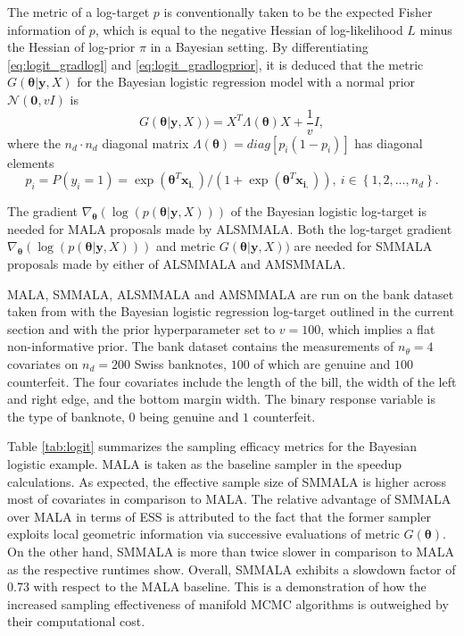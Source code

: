 \documentclass[twoside,11pt]{article}
\begin{document}
The metric of a log-target $p$ is conventionally taken to be the expected Fisher information of $p$, which is equal to the 
negative Hessian of log-likelihood $L$ minus the Hessian of log-prior $\pi$ in a Bayesian setting. By differentiating 
\eqref{eq:logit_gradlogl} and \eqref{eq:logit_gradlogprior}, it is deduced that the metric 
$G(\boldsymbol{\theta}|\mathbf{y}, X)$ for the Bayesian logistic regression model with a normal prior
$\mathcal{N}(\boldsymbol{0},vI)$ is
\begin{equation}
\label{eq:blr:G:normalprior}
G(\boldsymbol{\theta}|\mathbf{y}, X))=X^T\Lambda(\boldsymbol{\theta})X+
\frac{1}{v}I,
\end{equation}
where the $n_d\cdot n_d$ diagonal matrix $\Lambda(\boldsymbol{\theta})=diag[p_i(1-p_i)]$ has diagonal elements
\begin{equation}
p_i=P(y_i=1)=\exp(\boldsymbol{\theta}^T\mathbf{x_{i,}})/
(1+\exp(\boldsymbol{\theta}^T\mathbf{x_{i,}})),~i\in\left\{1,2,\dots,n_{d}\right\}.
\end{equation}

The gradient
$\nabla_{\boldsymbol{\theta}}(\log{(p(\boldsymbol{\theta}|\mathbf{y}, X))})$
of the Bayesian logistic log-target is needed for MALA proposals made by ALSMMALA. Both the log-target gradient
$\nabla_{\boldsymbol{\theta}}(\log{(p(\boldsymbol{\theta}|\mathbf{y}, X))})$ and metric
$G(\boldsymbol{\theta}|\mathbf{y}, X))$ are needed for SMMALA proposals made by either of ALSMMALA and AMSMMALA.

MALA, SMMALA, ALSMMALA and AMSMMALA are run on the bank dataset taken from \cite{flu_rie__mul} with the Bayesian logistic 
regression log-target outlined in the current section and with the prior hyperparameter set to $v=100$, which implies a  
flat non-informative prior. The bank dataset contains the measurements of $n_{\theta}=4$ covariates on $n_d=200$ Swiss 
banknotes, $100$ of which are genuine and $100$ counterfeit. The four covariates include the length of the bill, the width 
of the left and right edge, and the bottom margin width. The binary response variable is the type of banknote, $0$ being 
genuine and $1$ counterfeit.

Table \ref{tab:logit} summarizes the sampling efficacy metrics for the Bayesian logistic example. MALA is taken as the 
baseline sampler in the speedup calculations. As expected, the effective sample size of SMMALA is higher across most of 
covariates in comparison to MALA. The relative advantage of SMMALA over MALA in terms of ESS is attributed to the fact that 
the former sampler exploits local geometric information via successive evaluations of metric $G(\boldsymbol{\theta})$. On 
the other hand, SMMALA is more than twice slower in comparison to MALA as the respective runtimes show. Overall, SMMALA
exhibits a slowdown factor of $0.73$ with respect to the MALA baseline. This is a demonstration of how the increased
sampling effectiveness of manifold MCMC algorithms is outweighed by their computational cost.
\end{document}
